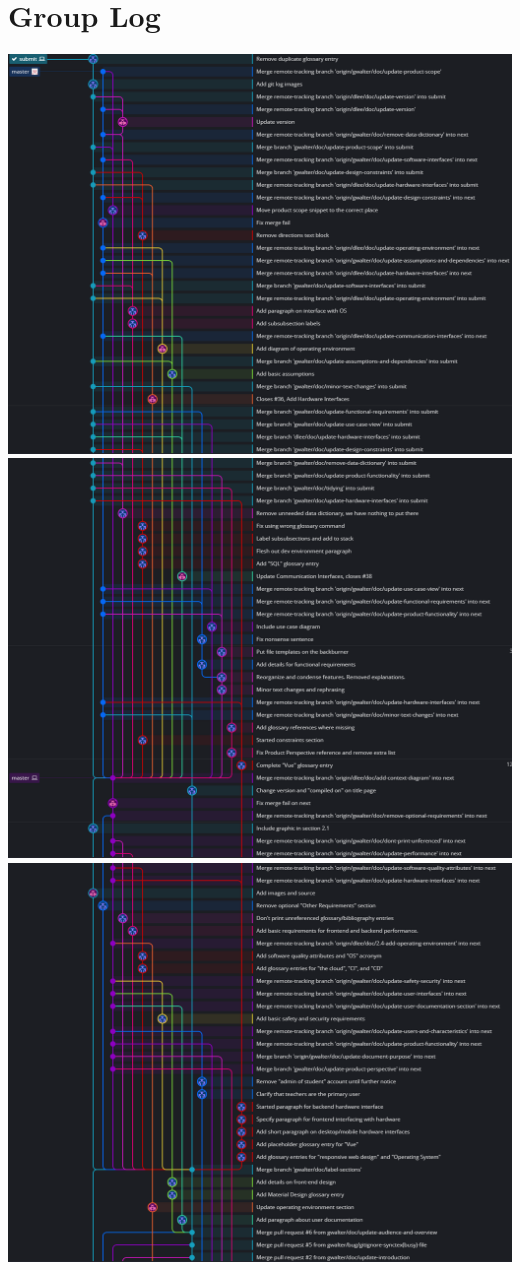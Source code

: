 
\section{Group Log}\label{sec:group-log}
    \begin{center}
        \includegraphics[width=.8\textwidth]{images/1.png}
        \includegraphics[width=.8\textwidth]{images/2.png}
        \includegraphics[width=.8\textwidth]{images/3.png}

\end{center}
